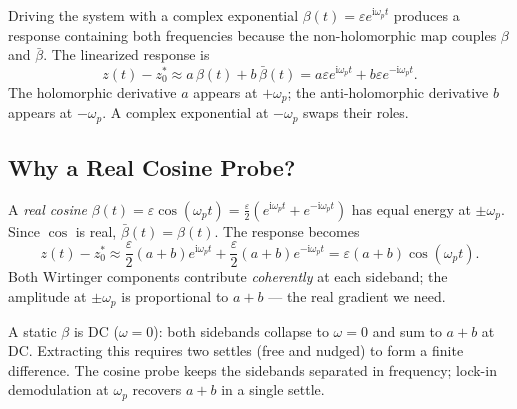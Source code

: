 \documentclass[11pt]{article}
\newcommand{\im}{\mathrm{i}}
\begin{document}
Driving the system with a complex exponential $\beta(t) = \varepsilon e^{\im\omega_p t}$ produces a response containing both frequencies because the non-holomorphic map couples $\beta$ and $\bar{\beta}$. The linearized response is
\begin{equation}
z(t) - z_0^* \approx a\,\beta(t) + b\,\bar{\beta}(t) = a\varepsilon e^{\im\omega_p t} + b\varepsilon e^{-\im\omega_p t}.
\end{equation}
The holomorphic derivative $a$ appears at $+\omega_p$; the anti-holomorphic derivative $b$ appears at $-\omega_p$. A complex exponential at $-\omega_p$ swaps their roles.

\subsection{Why a Real Cosine Probe?}\label{ssec:why-ac}

A \emph{real cosine} $\beta(t) = \varepsilon \cos(\omega_p t) = \frac{\varepsilon}{2}(e^{\im\omega_p t} + e^{-\im\omega_p t})$ has equal energy at $\pm\omega_p$. Since $\cos$ is real, $\bar{\beta}(t) = \beta(t)$. The response becomes
\begin{equation}
z(t) - z_0^* \approx \frac{\varepsilon}{2}(a+b) e^{\im\omega_p t} + \frac{\varepsilon}{2}(a+b) e^{-\im\omega_p t} = \varepsilon(a+b)\cos(\omega_p t).
\end{equation}
Both Wirtinger components contribute \emph{coherently} at each sideband; the amplitude at $\pm\omega_p$ is proportional to $a+b$ — the real gradient we need.

A static $\beta$ is DC ($\omega=0$): both sidebands collapse to $\omega=0$ and sum to $a+b$ at DC. Extracting this requires two settles (free and nudged) to form a finite difference. The cosine probe keeps the sidebands separated in frequency; lock-in demodulation at $\omega_p$ recovers $a+b$ in a single settle.
\end{document}

